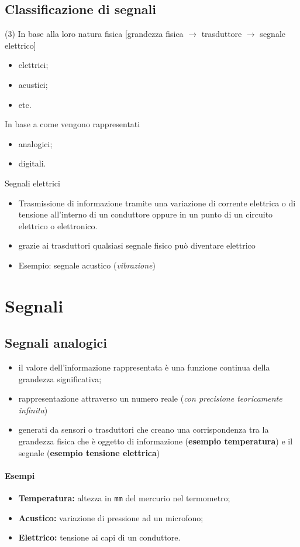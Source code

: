\subsection{Classificazione di segnali}
\begin{tasks}(3)
	\task In base alla loro natura fisica [grandezza fisica $\to$ trasduttore
	$\to$ segnale elettrico]
	\begin{itemize}
		\item elettrici;
		\item acustici;
		\item etc.
	\end{itemize}
	\task In base a come vengono rappresentati
	\begin{itemize}
		\item analogici;
		\item digitali.
	\end{itemize}
	\task Segnali elettrici
	\begin{itemize}
		\item Trasmissione di informazione tramite una variazione di corrente
			elettrica o di tensione all'interno di un conduttore oppure in un
			punto di un circuito elettrico o elettronico.
		\item grazie ai trasduttori qualsiasi segnale fisico può diventare
			elettrico
		\item Esempio: segnale acustico (\textit{vibrazione})
	\end{itemize}
\end{tasks}
\section{Segnali}
\subsection{Segnali analogici \label{sanalog}}
\begin{itemize}
	\item il valore dell'informazione rappresentata è una funzione continua
		della grandezza significativa;
	\item rappresentazione attraverso un numero reale (\textit{con precisione
		teoricamente infinita})
	\item generati da sensori o trasduttori che creano una corrispondenza tra
		la grandezza fisica che è oggetto di informazione (\textbf{esempio
		temperatura}) e il segnale (\textbf{esempio tensione elettrica})
\end{itemize}
\paragraph{Esempi}
\begin{itemize}
	\item \textbf{Temperatura:} altezza in \texttt{mm} del mercurio nel
		termometro;
	\item \textbf{Acustico:} variazione di pressione ad un microfono;
	\item \textbf{Elettrico:} tensione ai capi di un conduttore.
\end{itemize}
